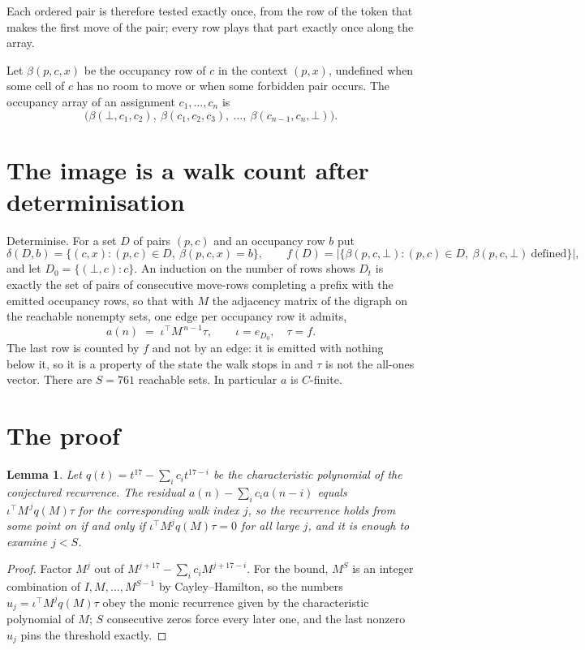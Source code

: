 \documentclass[11pt,a4paper]{article}
\theoremstyle{plain}
\newtheorem{lemma}[theorem]{Lemma}
\theoremstyle{definition}
\begin{document}
Each ordered pair is therefore tested exactly once, from the row of the token that makes the
first move of the pair; every row plays that part exactly once along the array.

Let $\beta(p,c,x)$ be the occupancy row of $c$ in the context $(p,x)$, undefined when some
cell of $c$ has no room to move or when some forbidden pair occurs. The occupancy array of an
assignment $c_1,\dots,c_n$ is
\[
\bigl(\beta(\bot,c_1,c_2),\ \beta(c_1,c_2,c_3),\ \dots,\ \beta(c_{n-1},c_n,\bot)\bigr).
\]

\section{The image is a walk count after determinisation}

Determinise. For a set $D$ of pairs $(p,c)$ and an occupancy row $b$ put
\[
\delta(D,b)=\{(c,x):(p,c)\in D,\ \beta(p,c,x)=b\},\qquad
f(D)=\bigl|\{\beta(p,c,\bot):(p,c)\in D,\ \beta(p,c,\bot)\ \text{defined}\}\bigr| ,
\]
and let $D_0=\{(\bot,c):c\}$. An induction on the number of rows shows $D_t$ is exactly the
set of pairs of consecutive move-rows completing a prefix with the emitted occupancy rows, so
that with $M$ the adjacency matrix of the digraph on the reachable nonempty sets, one edge per
occupancy row it admits,
\[
a(n)\;=\;\iota^{\!\top}M^{\,n-1}\tau,\qquad \iota=e_{D_0},\quad \tau=f .
\]
The last row is counted by $f$ and not by an edge: it is emitted with nothing below it, so it
is a property of the state the walk stops in and $\tau$ is not the all-ones vector. There are
$S=761$ reachable sets. In particular $a$ is $C$-finite.

\section{The proof}

\begin{lemma}\label{lem:crit}
Let $q(t)=t^{17}-\sum_i c_it^{17-i}$ be the characteristic polynomial of the
conjectured recurrence. The residual $a(n)-\sum_ic_ia(n-i)$ equals
$\iota^{\!\top}M^{\,j}q(M)\tau$ for the corresponding walk index $j$, so the recurrence
holds from some point on if and only if $\iota^{\!\top}M^{j}q(M)\tau=0$ for all large $j$,
and it is enough to examine $j<S$.
\end{lemma}

\begin{proof}
Factor $M^{j}$ out of $M^{j+17}-\sum_ic_iM^{j+17-i}$. For the bound, $M^{S}$
is an integer combination of $I,M,\dots,M^{S-1}$ by Cayley--Hamilton, so the numbers
$u_j=\iota^{\!\top}M^{j}q(M)\tau$ obey the monic recurrence given by the characteristic
polynomial of $M$; $S$ consecutive zeros force every later one, and the last nonzero $u_j$
pins the threshold exactly.
\end{proof}
\end{document}

